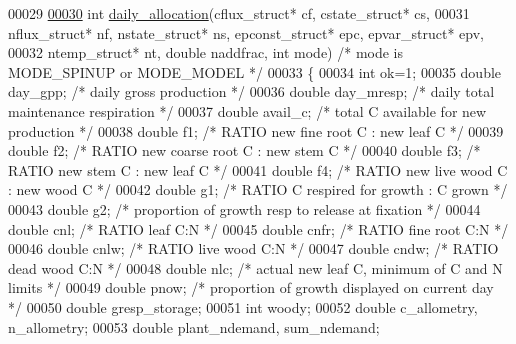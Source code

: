 \begin{DoxyCode}
00029 
\hypertarget{daily__allocation_8c_source_l00030}{}\hyperlink{daily__allocation_8c_a78494a491616be3574480363952f005f}{00030} \textcolor{keywordtype}{int} \hyperlink{daily__allocation_8c_a78494a491616be3574480363952f005f}{daily\_allocation}(cflux\_struct* cf, cstate\_struct* cs,
00031 nflux\_struct* nf, nstate\_struct* ns, epconst\_struct* epc, epvar\_struct* epv,
00032 ntemp\_struct* nt, \textcolor{keywordtype}{double} naddfrac, \textcolor{keywordtype}{int} mode) \textcolor{comment}{/* mode is MODE\_SPINUP or MODE\_MODEL */}
00033 \{
00034     \textcolor{keywordtype}{int} ok=1;
00035     \textcolor{keywordtype}{double} day\_gpp;     \textcolor{comment}{/* daily gross production */}
00036     \textcolor{keywordtype}{double} day\_mresp;   \textcolor{comment}{/* daily total maintenance respiration */}
00037     \textcolor{keywordtype}{double} avail\_c;     \textcolor{comment}{/* total C available for new production */}
00038     \textcolor{keywordtype}{double} f1;          \textcolor{comment}{/* RATIO   new fine root C : new leaf C     */}
00039     \textcolor{keywordtype}{double} f2;          \textcolor{comment}{/* RATIO   new coarse root C : new stem C   */}
00040     \textcolor{keywordtype}{double} f3;          \textcolor{comment}{/* RATIO   new stem C : new leaf C          */}
00041     \textcolor{keywordtype}{double} f4;          \textcolor{comment}{/* RATIO   new live wood C : new wood C     */}
00042     \textcolor{keywordtype}{double} g1;          \textcolor{comment}{/* RATIO   C respired for growth : C grown  */} 
00043     \textcolor{keywordtype}{double} g2;          \textcolor{comment}{/* proportion of growth resp to release at fixation */}
00044     \textcolor{keywordtype}{double} cnl;         \textcolor{comment}{/* RATIO   leaf C:N      */}
00045     \textcolor{keywordtype}{double} cnfr;        \textcolor{comment}{/* RATIO   fine root C:N */}
00046     \textcolor{keywordtype}{double} cnlw;        \textcolor{comment}{/* RATIO   live wood C:N */}
00047     \textcolor{keywordtype}{double} cndw;        \textcolor{comment}{/* RATIO   dead wood C:N */}
00048     \textcolor{keywordtype}{double} nlc;         \textcolor{comment}{/* actual new leaf C, minimum of C and N limits   */}      
00049     \textcolor{keywordtype}{double} pnow;        \textcolor{comment}{/* proportion of growth displayed on current day */} 
00050     \textcolor{keywordtype}{double} gresp\_storage;  
00051     \textcolor{keywordtype}{int} woody;
00052     \textcolor{keywordtype}{double} c\_allometry, n\_allometry;
00053     \textcolor{keywordtype}{double} plant\_ndemand, sum\_ndemand;

\end{DoxyCode}
